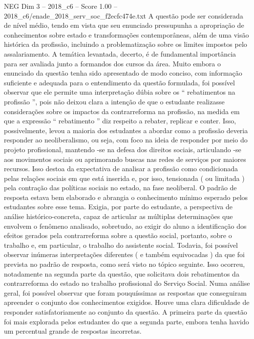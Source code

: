 \begin{textsample}{NEG Dim 3 – 2018\_c6 – Score 1.00 – 2018\_c6/enade\_2018\_serv\_soc\_f2ecfc474e.txt}
A questão pode ser considerada de nível médio, tendo em vista que seu enunciado pressupunha a apropriação de conhecimentos sobre estado e transformações contemporâneas, além de uma visão histórica da profissão, incluindo a problematização sobre os limites impostos pelo assalariamento.
A temática levantada, decerto, é de fundamental importância para ser avaliada junto a formandos dos cursos da área.
Muito embora o enunciado da questão tenha sido apresentado de modo conciso, com informação suficiente e adequada para o entendimento da questão formulada, foi possível observar que ele permite uma interpretação dúbia sobre os “ rebatimentos na profissão ”, pois não deixou clara a intenção de que o estudante realizasse considerações sobre os impactos da contrarreforma na profissão, na medida em que a expressão “ rebatimento ” diz respeito a rebater, replicar e conter.
Isso, possivelmente, levou a maioria dos estudantes a abordar como a profissão deveria responder ao neoliberalismo, ou seja, com foco na ideia de responder por meio do projeto profissional, mantendo -se na defesa dos direitos sociais, articulando -se aos movimentos sociais ou aprimorando buscas nas redes de serviços por maiores recursos.
Isso destoa da expectativa de analisar a profissão como condicionada pelas relações sociais em que está inserida e, por isso, tensionada ( ou limitada ) pela contração das políticas sociais no estado, na fase neoliberal.
O padrão de resposta estava bem elaborado e abrangia o conhecimento mínimo esperado pelos estudantes sobre esse tema.
Exigia, por parte do estudante, a perspectiva de análise histórico-concreta, capaz de articular as múltiplas determinações que envolvem o fenômeno analisado, sobretudo, ao exigir do aluno a identificação dos efeitos gerados pela contrarreforma sobre a questão social, portanto, sobre o trabalho e, em particular, o trabalho do assistente social.
Todavia, foi possível observar inúmeras interpretações diferentes ( e também equivocadas ) da que foi prevista no padrão de resposta, como será visto no tópico seguinte.
Isso ocorreu, notadamente na segunda parte da questão, que solicitava dois rebatimentos da contrarreforma do estado no trabalho profissional do Serviço Social.
Numa análise geral, foi possível observar que foram pouquíssimas as respostas que conseguiram apreender o conjunto dos conhecimentos exigidos.
Houve uma clara dificuldade de responder satisfatoriamente ao conjunto da questão.
A primeira parte da questão foi mais explorada pelos estudantes do que a segunda parte, embora tenha havido um percentual grande de respostas incorretas.

\end{textsample}
